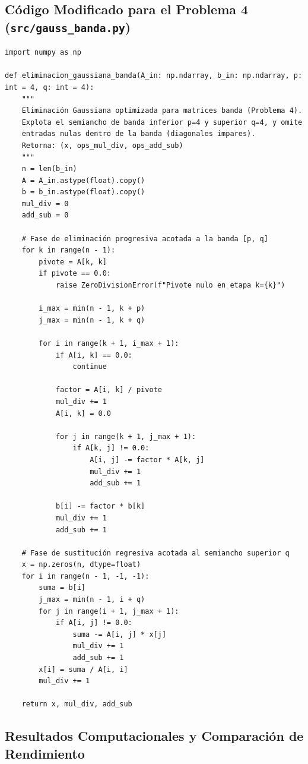 \documentclass[11pt,letterpaper]{article}
\begin{document}
\subsection{Código Modificado para el Problema 4 (\texttt{src/gauss\_banda.py})}

\begin{lstlisting}[caption={Implementación optimizada de Eliminación Gaussiana para matriz banda (Problema 4).}]
import numpy as np

def eliminacion_gaussiana_banda(A_in: np.ndarray, b_in: np.ndarray, p: int = 4, q: int = 4):
    """
    Eliminación Gaussiana optimizada para matrices banda (Problema 4).
    Explota el semiancho de banda inferior p=4 y superior q=4, y omite
    entradas nulas dentro de la banda (diagonales impares).
    Retorna: (x, ops_mul_div, ops_add_sub)
    """
    n = len(b_in)
    A = A_in.astype(float).copy()
    b = b_in.astype(float).copy()
    mul_div = 0
    add_sub = 0

    # Fase de eliminación progresiva acotada a la banda [p, q]
    for k in range(n - 1):
        pivote = A[k, k]
        if pivote == 0.0:
            raise ZeroDivisionError(f"Pivote nulo en etapa k={k}")

        i_max = min(n - 1, k + p)
        j_max = min(n - 1, k + q)

        for i in range(k + 1, i_max + 1):
            if A[i, k] == 0.0:
                continue

            factor = A[i, k] / pivote
            mul_div += 1
            A[i, k] = 0.0

            for j in range(k + 1, j_max + 1):
                if A[k, j] != 0.0:
                    A[i, j] -= factor * A[k, j]
                    mul_div += 1
                    add_sub += 1

            b[i] -= factor * b[k]
            mul_div += 1
            add_sub += 1

    # Fase de sustitución regresiva acotada al semiancho superior q
    x = np.zeros(n, dtype=float)
    for i in range(n - 1, -1, -1):
        suma = b[i]
        j_max = min(n - 1, i + q)
        for j in range(i + 1, j_max + 1):
            if A[i, j] != 0.0:
                suma -= A[i, j] * x[j]
                mul_div += 1
                add_sub += 1
        x[i] = suma / A[i, i]
        mul_div += 1

    return x, mul_div, add_sub
\end{lstlisting}

\subsection{Resultados Computacionales y Comparación de Rendimiento}
\end{document}
